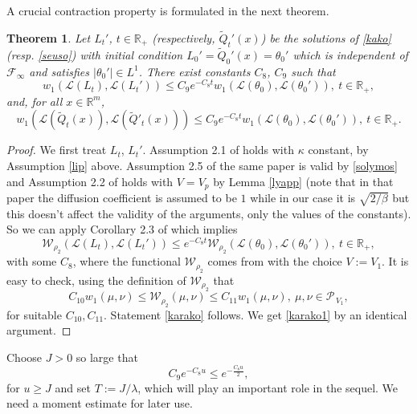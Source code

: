 \documentclass[a4paper,draft]{article}
\newtheorem{theorem}{Theorem}[section]
\begin{document}
A crucial contraction property is formulated in the next theorem.

\begin{theorem}\label{contra} Let $L_t'$,
$t\in\mathbb{R}_+$ (respectively, $\tilde{Q}_t'(x)$)
be the solutions of
\eqref{kako} (resp. \eqref{seuso})
with initial condition $L_0'=\tilde{Q}_0'(x)=\theta_0'$ which is independent of $\mathcal{F}_{\infty}$
and satisfies $|\theta_0'|\in L^1$. There exist constants $C_8$, $C_9$
such that
\begin{equation}\label{karako}
w_1(\mathcal{L}(L_t),\mathcal{L}(L_t'))\leq C_9 e^{-C_8 t}
w_1(\mathcal{L}(\theta_0),\mathcal{L}(\theta_0')),\ t\in\mathbb{R}_+,
\end{equation}
and, for all $x\in\mathbb{R}^m$,
\begin{equation}\label{karako1}
w_1(\mathcal{L}(\tilde{Q}_t(x)),\mathcal{L}(\tilde{Q}'_t(x)))\leq C_9 e^{-C_8 t}
w_1(\mathcal{L}(\theta_0),\mathcal{L}(\theta_0')),\ t\in\mathbb{R}_+.
\end{equation}
\end{theorem}
\begin{proof}
We first treat $L_t$, $L_t'$.
Assumption 2.1 of \cite{eberle} holds with $\kappa$ constant,
by Assumption \ref{lip} above. Assumption 2.5 of the same paper is valid
by \eqref{solymos} and Assumption 2.2 of \cite{eberle} holds with $V=V_p$ by Lemma
\ref{lyapp} (note that in that paper
the diffusion coefficient is assumed to be $1$ while in our case it is $\sqrt{2/\beta}$
but this doesn't affect the validity of the arguments, only the values of the constants).
So we can apply Corollary 2.3 of \cite{eberle} which implies
$$
\mathcal{W}_{\rho_2}
(\mathcal{L}(L_t),\mathcal{L}(L_t'))\leq e^{-C_8 t}
\mathcal{W}_{\rho_2}(\mathcal{L}(\theta_0),\mathcal{L}(\theta_0')),\ t\in\mathbb{R}_+,
$$
with some $C_8$, where the functional
$\mathcal{W}_{\rho_2}$ comes from \cite{eberle} with the choice $V:=V_1$.
It is easy to check, using the definition of $\mathcal{W}_{\rho_2}$ that
$$
C_{10} w_1(\mu,\nu)\leq
\mathcal{W}_{\rho_2}
(\mu,\nu)\leq C_{11} w_1(\mu,\nu),\ \mu,\nu\in\mathcal{P}_{\, V_1},
$$
for suitable $C_{10},C_{11}$. Statement \eqref{karako} follows. We get \eqref{karako1} by
an identical argument.
\end{proof}

Choose $J>0$ so large that
\begin{equation}\label{bartoli}
C_9 e^{-C_8 u}\leq e^{-\frac{C_8 u}{2}},
\end{equation}
for $u\geq J$ and set $T:=J/{\lambda}$, which will play an important role
in the sequel.
We need a moment estimate for later use.
\end{document}
